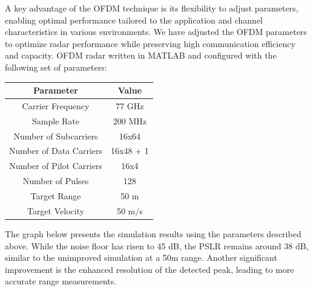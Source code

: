 \documentclass[conference]{IEEEtran}
\begin{document}
A key advantage of the OFDM technique is its flexibility to adjust parameters, enabling optimal performance tailored to the application and channel characteristics in various environments. We have adjusted the OFDM parameters to optimize radar performance while preserving high communication efficiency and capacity.
OFDM radar written in MATLAB and configured with the following set of parameters: 

\begin{center}
\begin{tabular}{|c|c|}
\hline
\textbf {Parameter} & \textbf {Value }\\
\hline
Carrier Frequency & 77 GHz \\
\hline
Sample Rate & 200 MHz \\
\hline
Number of Subcarriers & 16x64\\
\hline
Number of Data Carriers & 16x48 + 1 \\
\hline 
Number of Pilot Carriers & 16x4 \\
\hline 
Number of Pulses & 128 \\
\hline 
Target Range & 50 m \\
\hline 
Target Velocity & 50  m/s\\
\hline 
\end{tabular}
\end{center}


The graph below presents the simulation results using the parameters described above. While the noise floor has risen to 45 dB, the PSLR remains around 38 dB, similar to the unimproved simulation at a 50m range. Another significant improvement is the enhanced resolution of the detected peak, leading to more accurate range measurements.
\end{document}

